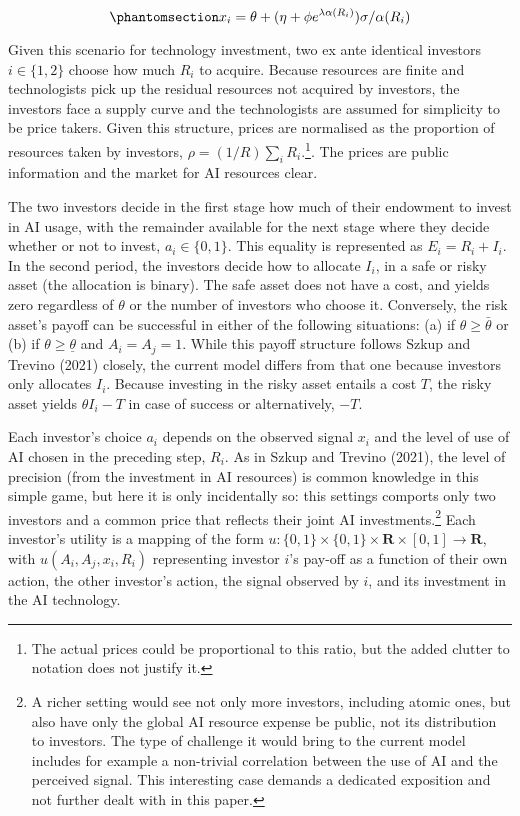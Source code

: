 \documentclass[
]{article}
\theoremstyle{plain}
\theoremstyle{definition}
\theoremstyle{remark}
\begin{document}
\begin{equation}\phantomsection\label{eq-privatesignals}{
x_i = \theta + (\eta + \phi e^{\lambda \alpha(R_i)}) \sigma / \alpha(R_i)
}\end{equation}

Given this scenario for technology investment, two ex ante identical
investors \(i \in \{1,2\}\) choose how much \(R_i\) to acquire. Because
resources are finite and technologists pick up the residual resources
not acquired by investors, the investors face a supply curve and the
technologists are assumed for simplicity to be price takers. Given this
structure, prices are normalised as the proportion of resources taken by
investors, \(\rho = (1/R)\sum_i R_i\).\footnote{The actual prices could
  be proportional to this ratio, but the added clutter to notation does
  not justify it.}. The prices are public information and the market for
AI resources clear.

The two investors decide in the first stage how much of their endowment
to invest in AI usage, with the remainder available for the next stage
where they decide whether or not to invest, \(a_i \in \{0, 1\}\). This
equality is represented as \(E_i = R_i + I_i\). In the second period,
the investors decide how to allocate \(I_i\), in a safe or risky asset
(the allocation is binary). The safe asset does not have a cost, and
yields zero regardless of \(\theta\) or the number of investors who
choose it. Conversely, the risk asset's payoff can be successful in
either of the following situations: (a) if \(\theta \geq \bar{\theta}\)
or (b) if \(\theta \geq \underline{\theta}\) and \(A_i = A_j = 1\).
While this payoff structure follows Szkup and Trevino (2021) closely,
the current model differs from that one because investors only allocates
\(I_i\). Because investing in the risky asset entails a cost \(T\), the
risky asset yields \(\theta I_i - T\) in case of success or
alternatively, \(-T\).

Each investor's choice \(a_i\) depends on the observed signal \(x_i\)
and the level of use of AI chosen in the preceding step, \(R_i\). As in
Szkup and Trevino (2021), the level of precision (from the investment in
AI resources) is common knowledge in this simple game, but here it is
only incidentally so: this settings comports only two investors and a
common price that reflects their joint AI investments.\footnote{A richer
  setting would see not only more investors, including atomic ones, but
  also have only the global AI resource expense be public, not its
  distribution to investors. The type of challenge it would bring to the
  current model includes for example a non-trivial correlation between
  the use of AI and the perceived signal. This interesting case demands
  a dedicated exposition and not further dealt with in this paper.} Each
investor's utility is a mapping of the form
\(u : \{0, 1\} \times \{0, 1\} \times \mathbf{R} \times [0, 1] \to \mathbf{R}\),
with \(u(A_i, A_j, x_i, R_i)\) representing investor \(i\)'s pay-off as
a function of their own action, the other investor's action, the signal
observed by \(i\), and its investment in the AI technology.
\end{document}
